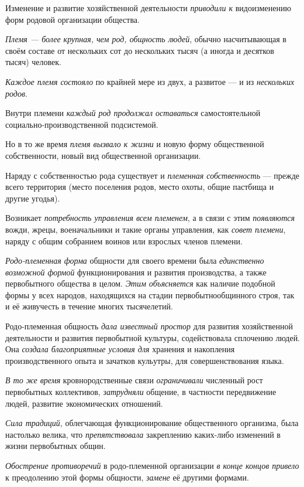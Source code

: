 \documentclass[a4paper,14pt,russian]{extreport}
\begin{document}
Изменение и развитие хозяйственной деятельности \emph{приводили к} видоизменению форм родовой организации общества.

\emph{Племя --- более крупная, чем род, общность людей}, обычно насчитывающая в своём составе от нескольких сот до нескольких тысяч (а иногда и десятков тысяч) человек.

\emph{Каждое племя состояло} по крайней мере из двух, а развитое --- и из \emph{нескольких родов}.

Внутри племени \emph{каждый род продолжал оставаться} самостоятельной социально-производственной подсистемой.

Но в то же время \emph{племя вызвало к жизни} и новую форму общественной собственности, новый вид общественной организации.

Наряду с собственностью рода существует и \emph{племенная собственность} --- прежде всего территория (место поселения родов, место охоты, общие пастбища и другие угодья).

Возникает \emph{потребность управления всем племенем}, а в связи с этим \emph{появляются} вожди, жрецы, военачальники и такие органы управления, как \emph{совет племени}, наряду с общим собранием воинов или взрослых членов племени.

\emph{Родо-племенная форма} общности для своего времени была \emph{единственно возможной формой} функционирования и развития производства, а также первобытного общества в целом. \emph{Этим объясняется} как наличие подобной формы у всех народов, находящихся на стадии первобытнообщинного строя, так и её живучесть в течение многих тысячелетий.

Родо-племенная общность \emph{дала известный простор} для развития хозяйственной деятельности и развития первобытной культуры, содействовала сплочению людей. Она \emph{создала благоприятные условия для} хранения и накопления производственного опыта и зачатков кульутры, для совершенствования языка.

\emph{В то же время} кровнородственные связи \emph{ограничивали} численный рост первобытных коллективов, \emph{затрудняли} общение, в частности передвижение людей, развитие экономических отношений.

\emph{Сила традиций}, облегчающая функционирование общественного организма, была настолько велика, что \emph{препятствовала} закреплению каких-либо изменений в жизни первобытных общин.

\emph{Обострение противоречий} в родо-племенной организации \emph{в конце концов привело} к преодолению этой формы общности, \emph{замене} её другими формами.
\end{document}
